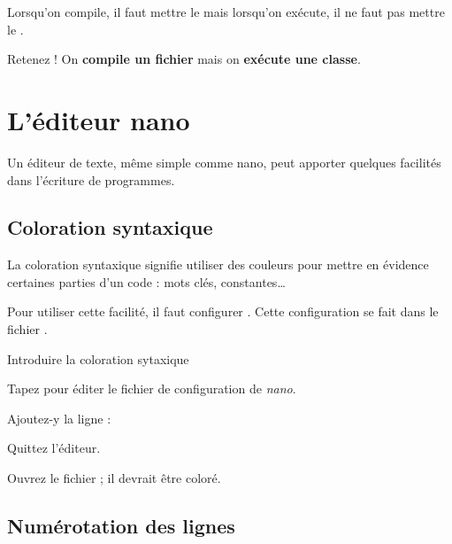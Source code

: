 \documentclass[a4paper,11pt]{style-esi/td}
\begin{document}
    Lorsqu'on compile, il faut mettre le  
    mais lorsqu'on exécute, 
    il ne faut pas mettre le .

    \begin{alerttbox}{Retenez !} 
        On \textbf{compile un fichier} mais on \textbf{exécute une classe}.
    \end{alerttbox}

\newpage
\section{L'éditeur nano}

	Un éditeur de texte, même simple comme nano,
	peut apporter quelques facilités dans l'écriture de programmes.

	\subsection{Coloration syntaxique}

		La coloration syntaxique signifie 
		utiliser des couleurs pour mettre en évidence certaines parties d'un code :
		mots clés, constantes\dots{}
	
		Pour utiliser cette facilité, 
		il faut configurer . 
		Cette configuration se fait dans le fichier .

		\begin{Tutoriel}{Introduire la coloration sytaxique} 
			\vspace{-1em}
			\begin{steps}
			\item 
				Tapez  
				pour éditer le fichier de configuration de \emph{nano}.
			\item 
				Ajoutez-y la ligne : 
			\item 
				Quittez l'éditeur.
			\item 
				Ouvrez le fichier ;
				il devrait être coloré.
			\end{steps}
		\end{Tutoriel}
				
	\subsection{Numérotation des lignes}
				
\end{document}
